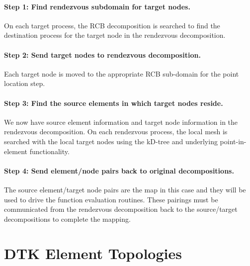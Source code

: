 \documentclass[letterpaper,12pt]{article}
\begin{document}
\paragraph{Step 1: Find rendezvous subdomain for target nodes.}
On each target process, the RCB decomposition is searched to find the
destination process for the target node in the rendezvous
decomposition.

\paragraph{Step 2: Send target nodes to rendezvous decomposition.}
Each target node is moved to the appropriate RCB sub-domain for the
point location step.

\paragraph{Step 3: Find the source elements in which target nodes reside.}
We now have source element information and target node information in
the rendezvous decomposition. On each rendezvous process, the local
mesh is searched with the local target nodes using the kD-tree and
underlying point-in-element functionality.

\paragraph{Step 4: Send element/node pairs back to original
  decompositions.}  The source element/target node pairs are the map
in this case and they will be used to drive the function evaluation
routines. These pairings must be communicated from the rendezvous
decomposition back to the source/target decompositions to complete the
mapping.


\clearpage




\clearpage

\appendix
\section{DTK Element Topologies}\label{apdx:cell_topo}
\end{document}
